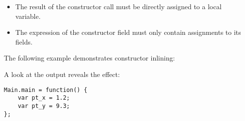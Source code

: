 \begin{itemize}
	\item The result of the constructor call must be directly assigned to a local variable.
	\item The expression of the constructor field must only contain assignments to its fields.
\end{itemize}

The following example demonstrates constructor inlining:


A look at the  output reveals the effect:

\begin{lstlisting}
Main.main = function() {
	var pt_x = 1.2;
	var pt_y = 9.3;
};
\end{lstlisting}

